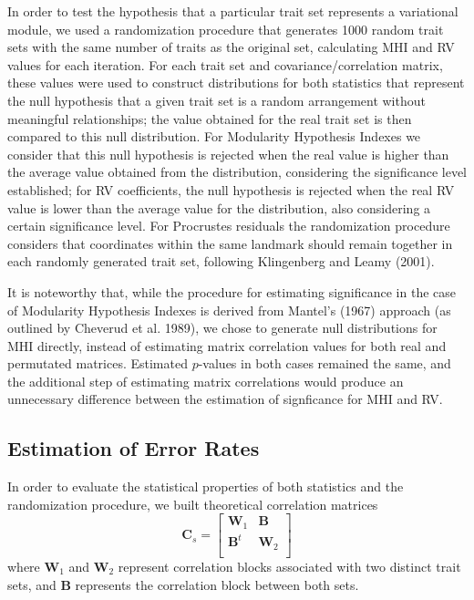 \documentclass[12pt,]{article}
\begin{document}
In order to test the hypothesis that a particular trait set represents a
variational module, we used a randomization procedure that generates
1000 random trait sets with the same number of traits as the original
set, calculating MHI and RV values for each iteration. For each trait
set and covariance/correlation matrix, these values were used to
construct distributions for both statistics that represent the null
hypothesis that a given trait set is a random arrangement without
meaningful relationships; the value obtained for the real trait set is
then compared to this null distribution. For Modularity Hypothesis
Indexes we consider that this null hypothesis is rejected when the real
value is higher than the average value obtained from the distribution,
considering the significance level established; for RV coefficients, the
null hypothesis is rejected when the real RV value is lower than the
average value for the distribution, also considering a certain
significance level. For Procrustes residuals the randomization procedure
considers that coordinates within the same landmark should remain
together in each randomly generated trait set, following Klingenberg and
Leamy (2001).

It is noteworthy that, while the procedure for estimating significance
in the case of Modularity Hypothesis Indexes is derived from Mantel's
(1967) approach (as outlined by Cheverud et al. 1989), we chose to
generate null distributions for MHI directly, instead of estimating
matrix correlation values for both real and permutated matrices.
Estimated $p$-values in both cases remained the same, and the additional
step of estimating matrix correlations would produce an unnecessary
difference between the estimation of signficance for MHI and RV.

\subsection{Estimation of Error Rates}\label{estimation-of-error-rates}

In order to evaluate the statistical properties of both statistics and
the randomization procedure, we built theoretical correlation matrices
\[
\mathbf{C}_{s} =
\begin{bmatrix}
\mathbf{W}_1 & \mathbf{B} \\
\mathbf{B}^t & \mathbf{W}_2 \\
\end{bmatrix}
\] where $\mathbf{W}_1$ and $\mathbf{W}_2$ represent correlation blocks
associated with two distinct trait sets, and $\mathbf{B}$ represents the
correlation block between both sets.
\end{document}
